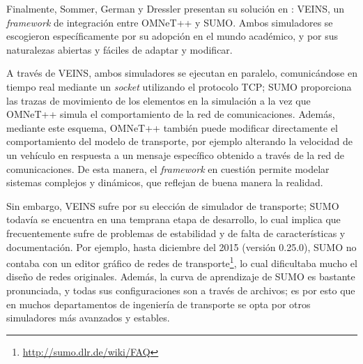 Finalmente, Sommer, German y Dressler presentan su solución en \autocite{sommer_german_dressler}: VEINS, un \textit{framework} de integración entre OMNeT++ y SUMO. Ambos simuladores se escogieron específicamente por su adopción en el mundo académico, y por sus naturalezas abiertas y fáciles de adaptar y modificar.

A través de VEINS, ambos simuladores se ejecutan en paralelo, comunicándose en tiempo real mediante un \textit{socket} utilizando el protocolo TCP; SUMO proporciona las trazas de movimiento de los elementos en la simulación a la vez que OMNeT++ simula el comportamiento de la red de comunicaciones. Además, mediante este esquema, OMNeT++ también puede modificar directamente el comportamiento del modelo de transporte, por ejemplo alterando la velocidad de un vehículo en respuesta a un mensaje específico obtenido a través de la red de comunicaciones. De esta manera, el \textit{framework} en cuestión permite modelar sistemas complejos y dinámicos, que reflejan de buena manera la realidad.

Sin embargo, VEINS sufre por su elección de simulador de transporte; SUMO todavía se encuentra en una temprana etapa de desarrollo, lo cual implica que frecuentemente sufre de problemas de estabilidad y de falta de características y documentación. Por ejemplo, hasta diciembre del 2015 (versión 0.25.0), SUMO no contaba con un editor gráfico de redes de transporte\footnote{\url{http://sumo.dlr.de/wiki/FAQ}}, lo cual dificultaba mucho el diseño de redes originales. Además, la curva de aprendizaje de SUMO es bastante pronunciada, y todas sus configuraciones son a través de archivos; es por esto que en muchos departamentos de ingeniería de transporte se opta por otros simuladores más avanzados y estables.


